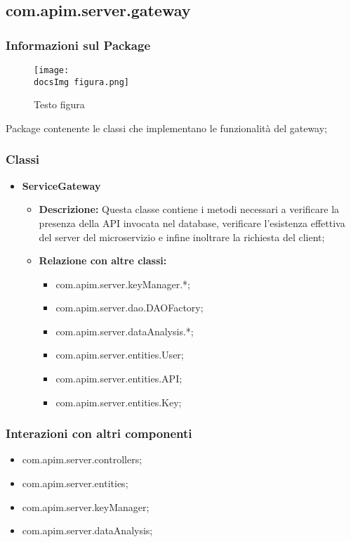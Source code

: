 {{  \subsection{com.apim.server.gateway}{
    \subsubsection{Informazioni sul Package}
      \begin{figure}[ht]
        \centering
        \texttt{[image: \\docsImg figura.png]}
        \caption{Testo figura}
        \label{Testo figura}
      \end{figure}
      Package  contenente le classi che implementano le funzionalità del gateway;
      \subsubsection{Classi}
      \begin{itemize} \itemsep1pt
      \item \textbf{ServiceGateway}
      \begin{itemize}
      \item \textbf{Descrizione:} Questa classe contiene i metodi necessari a verificare la presenza della API invocata nel database, verificare l'esistenza effettiva del server del microservizio e infine inoltrare la richiesta del client;
      \item \textbf{Relazione con altre classi:}
      \begin{itemize}
      \item com.apim.server.keyManager.*;
      \item com.apim.server.dao.DAOFactory;
      \item com.apim.server.dataAnalysis.*;
      \item com.apim.server.entities.User;
      \item com.apim.server.entities.API;
      \item com.apim.server.entities.Key;
      \end{itemize}
      \end{itemize}
      \end{itemize}
      \subsubsection{Interazioni con altri componenti}
      \begin{itemize}
      \item com.apim.server.controllers;
      \item com.apim.server.entities;
      \item com.apim.server.keyManager;
      \item com.apim.server.dataAnalysis;
      \end{itemize}
  }
}}
